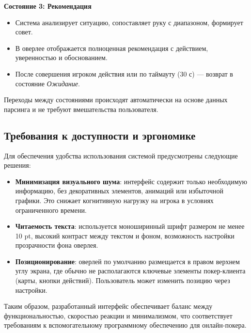 \textbf{Состояние 3: Рекомендация}
\begin{itemize}
    \item Система анализирует ситуацию, сопоставляет руку с диапазоном, формирует совет.
    \item В оверлее отображается полноценная рекомендация с действием, уверенностью и обоснованием.
    \item После совершения игроком действия или по таймауту (30 с) --- возврат в состояние \textit{Ожидание}.
\end{itemize}

Переходы между состояниями происходят автоматически на основе данных парсинга и не требуют вмешательства пользователя.

\subsection{Требования к доступности и эргономике}

Для обеспечения удобства использования системой предусмотрены следующие решения:

\begin{itemize}
    \item \textbf{Минимизация визуального шума}: интерфейс содержит только необходимую информацию, без декоративных элементов, анимаций или избыточной графики. Это снижает когнитивную нагрузку на игрока в условиях ограниченного времени.
    
    \item \textbf{Читаемость текста}: используется моноширинный шрифт размером не менее 10 pt, высокий контраст между текстом и фоном, возможность настройки прозрачности фона оверлея.
    
    \item \textbf{Позиционирование}: оверлей по умолчанию размещается в правом верхнем углу экрана, где обычно не располагаются ключевые элементы покер-клиента (карты, кнопки действий). Пользователь может изменить позицию через настройки.
    
\end{itemize}

Таким образом, разработанный интерфейс обеспечивает баланс между функциональностью, скоростью реакции и минимализмом, что соответствует требованиям к вспомогательному программному обеспечению для онлайн-покера.
